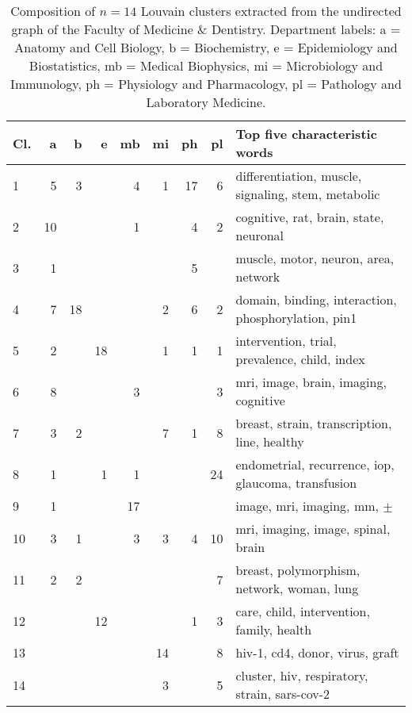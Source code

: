 \documentclass[12pt]{article}
\begin{document}
\begin{table}[hbtp]
\centering
\begin{tabular}{lrrrrrrrp{3in}}
Cl. & a & b & e & mb & mi & ph & pl & Top five characteristic words\\
\hline
1 & 5 & 3 & & 4 & 1 & 17 & 6 & differentiation, muscle, signaling, stem, metabolic\\
2 & 10 &  &  & 1 &  & 4 & 2 & cognitive, rat, brain, state, neuronal\\
3 & 1 &  &  &  &  &  5 &  & muscle, motor, neuron, area, network\\
4 & 7 & 18 &  &  & 2 & 6 & 2 & domain, binding, interaction, phosphorylation, pin1\\
5 & 2 &  & 18 &  & 1 & 1 & 1 & intervention, trial, prevalence, child, index\\
6 & 8 &  &  & 3 &  &  & 3 & mri, image, brain, imaging, cognitive\\
7 & 3 & 2 &  &  & 7 &  1 & 8 & breast, strain, transcription, line, healthy\\
8 & 1 &  & 1 & 1 &  &  & 24 & endometrial, recurrence, iop, glaucoma, transfusion\\
9 & 1 &  &  & 17 &  &  &  & image, mri, imaging, mm, $\pm$\\
10 & 3 & 1 &  & 3 & 3 & 4 & 10 & mri, imaging, image, spinal, brain\\
11 & 2 & 2 &  &  &  &  &  7 & breast, polymorphism, network, woman, lung\\
12 &  &  & 12 &  &  & 1 & 3 & care, child, intervention, family, health\\
13 &  &  &  &  &  14 &  & 8 & hiv-1, cd4, donor, virus, graft\\
14 &  &  &  &  &  3 &  & 5 & cluster, hiv, respiratory, strain, sars-cov-2\\
\hline
\end{tabular}
\caption{
Composition of $n=14$ Louvain clusters extracted from the undirected graph of the Faculty of Medicine \& Dentistry.
Department labels: a = Anatomy and Cell Biology, b = Biochemistry, e = Epidemiology and Biostatistics, mb = Medical Biophysics, mi = Microbiology and Immunology, ph = Physiology and Pharmacology, pl = Pathology and Laboratory Medicine.
}
\label{tab:faculty-clusters}
\end{table}
\end{document}
